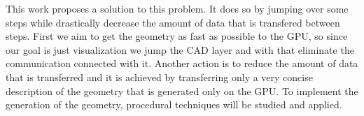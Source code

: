 

This work proposes a solution to this problem. It does so by jumping over some steps while drastically decrease the amount of data that is transfered between steps. First we aim to get the geometry as fast as possible to the GPU, so since our goal is just visualization we jump the CAD layer and with that eliminate the communication connected with it. Another action is to reduce the amount of data that is transferred and it is achieved by transferring only a very concise description of the geometry that is generated only on the GPU. To implement the generation of the geometry, procedural techniques will be studied and applied.

